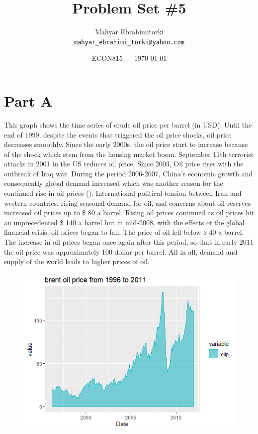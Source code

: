 \documentclass{article}
\title{Problem Set \#5} %
\author{Mahyar Ebrahimitorki\\ \texttt{mahyar\_ebrahimi\_torki@yahoo.com}} %
\date{ECON815 --- \today} %
\begin{document}
\maketitle %


\section*{Part A} %
This graph shows the time series of crude oil price per barrel (in USD). Until the end of 1999, despite the events that triggered the oil price shocks, oil price decreases smoothly. Since the early 2000s, the oil price start to increase because of the shock which stem from the housing market boom. September 11th terrorist attacks in 2001 in the US reduces oil price. Since 2003, Oil price rises with the outbreak of Iraq war. During the period 2006-2007, China's economic growth and consequently global demand increased which was another reason for the continued rise in oil prices (\cite{filis2011dynamic}). International political tension between Iran and western countries, rising seasonal demand for oil, and concerns about oil reserves increased oil prices up to \$ 80 a barrel. Rising oil prices continued as oil prices hit an unprecedented \$ 140 a barrel but in mid-2008, with the effects of the global financial crisis, oil prices began to fall. The price of oil fell below \$ 40 a barrel. The increase in oil prices began once again after this period, so that in early 2011 the oil price was approximately 100 dollar per barrel. All in all, demand and supply of the world leads to higher prices of oil.


\begin{figure}[htbp]
	\begin{center}
		\includegraphics{Rplot01.png}
		\caption{ }
	\end{center}
\end{figure}
\end{document}
